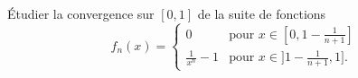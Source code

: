 

\begin{exercice}\label{exo119}

Étudier la convergence sur $[0,1]$ de la suite de fonctions
\begin{equation}
	f_n(x)=
\begin{cases}
	0	&	\text{pour $x\in[0,1-\frac{ 1 }{ n+1 }]$}\\
	\frac{1}{ x^n }-1	&	 \text{pour $x\in]1-\frac{1}{ n+1 },1]$.}
\end{cases}
\end{equation}

\end{exercice}
